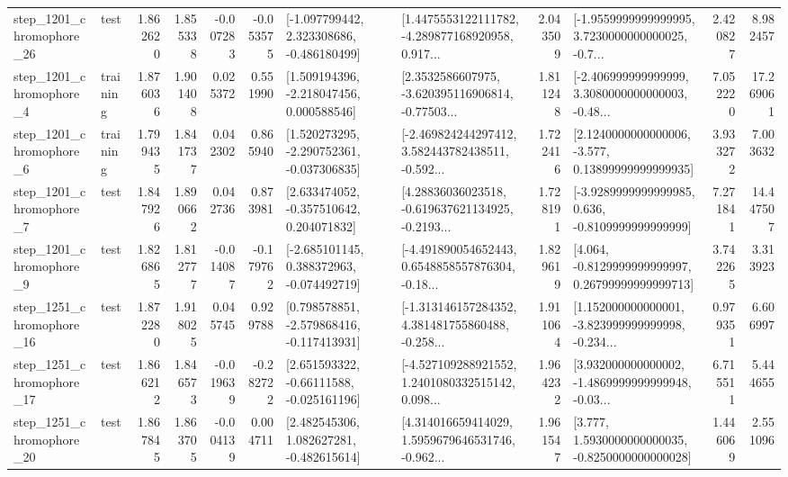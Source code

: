 \begin{tabular}{llrrrrllrlrr}
 step\_1201\_chromophore\_26 &      test &      1.862620 &    1.855338 &     -0.007283 & -0.053575 &   [-1.097799442, 2.323308686, -0.486180499] &  [1.4475553122111782, -4.289877168920958, 0.917... &       2.043509 &  [-1.9559999999999995, 3.7230000000000025, -0.7... &            2.420827 &          8.982457 \\
  step\_1201\_chromophore\_4 &  training &      1.876036 &    1.901408 &      0.025372 &  0.551990 &    [1.509194396, -2.218047456, 0.000588546] &  [2.3532586607975, -3.620395116906814, -0.77503... &       1.811248 &  [-2.406999999999999, 3.3080000000000003, -0.48... &            7.052220 &         17.269061 \\
  step\_1201\_chromophore\_6 &  training &      1.799435 &    1.841737 &      0.042302 &  0.865940 &   [1.520273295, -2.290752361, -0.037306835] &  [-2.469824244297412, 3.582443782438511, -0.592... &       1.722416 &  [2.1240000000000006, -3.577, 0.13899999999999935] &            3.933272 &          7.003632 \\
  step\_1201\_chromophore\_7 &      test &      1.847926 &    1.890662 &      0.042736 &  0.873981 &    [2.633474052, -0.357510642, 0.204071832] &  [4.28836036023518, -0.619637621134925, -0.2193... &       1.728191 &  [-3.9289999999999985, 0.636, -0.8109999999999999] &            7.271841 &         14.447507 \\
  step\_1201\_chromophore\_9 &      test &      1.826865 &    1.812777 &     -0.014087 & -0.179762 &   [-2.685101145, 0.388372963, -0.074492719] &  [-4.491890054652443, 0.6548858557876304, -0.18... &       1.829619 &  [4.064, -0.8129999999999997, 0.26799999999999713] &            3.742265 &          3.313923 \\
 step\_1251\_chromophore\_16 &      test &      1.872280 &    1.918025 &      0.045745 &  0.929788 &   [0.798578851, -2.579868416, -0.117413931] &  [-1.313146157284352, 4.381481755860488, -0.258... &       1.911064 &  [1.152000000000001, -3.823999999999998, -0.234... &            0.979351 &          6.606997 \\
 step\_1251\_chromophore\_17 &      test &      1.866212 &    1.846573 &     -0.019639 & -0.282722 &    [2.651593322, -0.66111588, -0.025161196] &  [-4.527109288921552, 1.2401080332515142, 0.098... &       1.964232 &  [3.932000000000002, -1.4869999999999948, -0.03... &            6.715511 &          5.444655 \\
 step\_1251\_chromophore\_20 &      test &      1.867845 &    1.863705 &     -0.004139 &  0.004711 &    [2.482545306, 1.082627281, -0.482615614] &  [4.314016659414029, 1.5959679646531746, -0.962... &       1.961547 &   [3.777, 1.5930000000000035, -0.8250000000000028] &            1.446069 &          2.551096 \\

\end{tabular}
